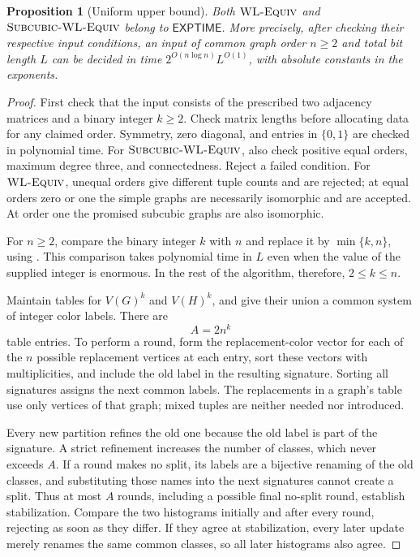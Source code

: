 \documentclass[11pt]{article}
\newtheorem{proposition}[theorem]{Proposition}
\theoremstyle{definition}
\newcommand{\EXPTIME}{\mathsf{EXPTIME}}
\newcommand{\WL}{\textnormal{\textsc{WL-Equiv}}}
\newcommand{\SubWL}{\textnormal{\textsc{Subcubic-WL-Equiv}}}
\begin{document}
\begin{proposition}[Uniform upper bound]
\label{prop:membership}
Both \(\WL\) and \(\SubWL\) belong to \(\EXPTIME\).
More precisely, after checking their respective input conditions,
an input of common graph order \(n\ge2\) and total bit length \(L\)
can be decided in time
$2^{O(n\log n)}L^{O(1)}$, with absolute constants in the exponents.
\end{proposition}

\begin{proof}
First check that the input consists of the prescribed two adjacency matrices
and a binary integer $k\geq 2$.  Check matrix lengths before allocating data
for any claimed order.  Symmetry, zero diagonal, and entries in \(\{0,1\}\) are checked in
polynomial time. For \(\SubWL\), also check positive equal orders,
maximum degree three, and connectedness. Reject a failed condition.
For \(\WL\), unequal orders give different tuple counts and are
rejected; at equal orders zero or one the simple graphs are necessarily
isomorphic and are accepted. At order one the promised subcubic graphs
are also isomorphic.

For $n\geq 2$, compare the binary integer $k$ with $n$ and replace it by
$\min\{k,n\}$, using .  This comparison takes
polynomial time in $L$ even when the value of the supplied integer is
enormous.  In the rest of the algorithm, therefore, $2\leq k\leq n$.

Maintain tables for $V(G)^k$ and $V(H)^k$, and give their union a common
system of integer color labels.  There are
\[
 A=2n^k
\]
table entries.  To perform a round, form the replacement-color vector for
each of the $n$ possible replacement vertices at each entry, sort these
vectors with multiplicities, and include the old label in the resulting
signature.  Sorting all signatures assigns the next common labels.  The
replacements in a graph's table use only vertices of that graph; mixed
tuples are neither needed nor introduced.

Every new partition refines the old one because the old label is part of
the signature.  A strict refinement increases the number of classes, which
never exceeds $A$.  If a round makes no split, its labels are a bijective
renaming of the old classes, and substituting those names into the next
signatures cannot create a split.  Thus at most $A$ rounds, including a
possible final no-split round, establish stabilization.  Compare the two
histograms initially and after every round, rejecting as soon as they
differ.  If they agree at stabilization, every later update merely renames
the same common classes, so all later histograms also agree.


\end{proof}
\end{document}
